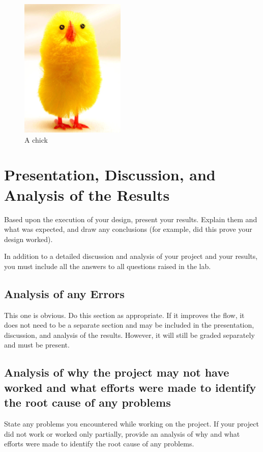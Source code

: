 \documentclass[12pt]{article} %
\begin{document}
\begin{figure}[h]
    \centering
    \label{figure:chick}
    \includegraphics{figure1.png}
    \caption{A chick}
\end{figure}

\section{Presentation, Discussion, and Analysis of the Results}

Based upon the execution of your design, present your results. Explain them and what was expected, and draw any conclusions (for example, did this prove your design worked).

In addition to a detailed discussion and analysis of your project and your results, you must include all the answers to all questions raised in the lab.

\subsection{Analysis of any Errors}

This one is obvious. Do this section as appropriate.  If it improves the flow, it does not need to be a separate section and may be included in the presentation, discussion, and analysis of the results.  However, it will still be graded separately and must be present.

\subsection{Analysis of why the project may not have worked and what efforts were made to identify the root cause of any problems}

State any problems you encountered while working on the project. If your project did not work or worked only partially, provide an analysis of why and what efforts were made to identify the root cause of any problems.
\end{document}
